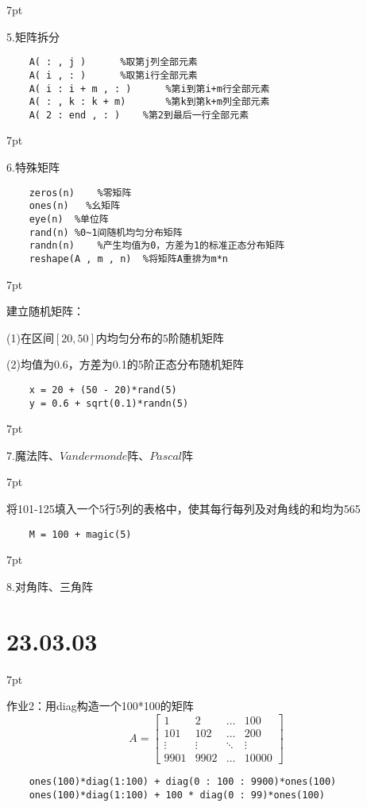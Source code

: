 \documentclass{article} %
\newenvironment{eg}{%
\def\FrameCommand{%
\hspace{1pt}%
{\color{Gray}\vrule width 2pt}%
{\color{egshade}\vrule width 4pt}%
\colorbox{egshade}%
}%
\MakeFramed{\advance\hsize-\width\FrameRestore}%
\noindent\hspace{-4.55pt}%
\begin{adjustwidth}{}{7pt}%
\vspace{2pt}\vspace{2pt}%
\normalfont %
}
{%
\vspace{2pt}\end{adjustwidth}\endMakeFramed%
}
\newenvironment{wa}{%
\def\FrameCommand{%
\hspace{1pt}%
{\color{LightCoral}\vrule width 2pt}%
{\color{washade}\vrule width 4pt}%
\colorbox{washade}%
}%
\MakeFramed{\advance\hsize-\width\FrameRestore}%
\noindent\hspace{-4.55pt}%
\begin{adjustwidth}{}{7pt}%
\vspace{2pt}\vspace{2pt}%
\normalfont %
}
{%
\vspace{2pt}\end{adjustwidth}\endMakeFramed%
}
\begin{document}
\begin{eg}
    5.矩阵拆分
\end{eg}
\begin{lstlisting}
    A( : , j )      %取第j列全部元素
    A( i , : )      %取第i行全部元素
    A( i : i + m , : )      %第i到第i+m行全部元素
    A( : , k : k + m)       %第k到第k+m列全部元素
    A( 2 : end , : )    %第2到最后一行全部元素
\end{lstlisting}

\begin{eg}
    6.特殊矩阵
\end{eg}
\begin{lstlisting}
    zeros(n)    %零矩阵
    ones(n)   %幺矩阵
    eye(n)  %单位阵
    rand(n) %0~1间随机均匀分布矩阵
    randn(n)    %产生均值为0，方差为1的标准正态分布矩阵
    reshape(A , m , n)  %将矩阵A重排为m*n
\end{lstlisting}

\begin{wa}
    建立随机矩阵：
    
    (1)在区间$[20,50]$内均匀分布的$5$阶随机矩阵
    
    (2)均值为0.6，方差为0.1的5阶正态分布随机矩阵
\end{wa}
\begin{lstlisting}
    x = 20 + (50 - 20)*rand(5)
    y = 0.6 + sqrt(0.1)*randn(5)
\end{lstlisting}

\begin{eg}
    7.魔法阵、$Vandermonde$阵、$Pascal$阵
\end{eg}

\begin{wa}
    将101-125填入一个5行5列的表格中，使其每行每列及对角线的和均为565
\end{wa}
\begin{lstlisting}
    M = 100 + magic(5)
\end{lstlisting}

\begin{eg}
    8.对角阵、三角阵
\end{eg}




\newpage
\noindent \Large \section*{23.03.03} \par \normalsize
\begin{wa}
    作业2：用diag构造一个100*100的矩阵
    $$A =     
    \begin{bmatrix}
        1 & 2 & \dots & 100 \\
        101 & 102 & \dots & 200 \\
        \vdots & \vdots & \ddots & \vdots \\
        9901 & 9902 & \dots & 10000 
    \end{bmatrix}$$
\end{wa}
\begin{lstlisting}
    ones(100)*diag(1:100) + diag(0 : 100 : 9900)*ones(100)
    ones(100)*diag(1:100) + 100 * diag(0 : 99)*ones(100)
\end{lstlisting}
\end{document}
